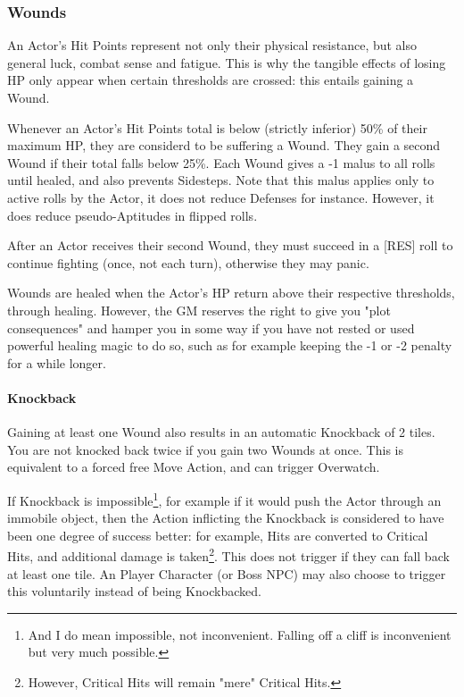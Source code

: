 \subsubsection{Wounds} 
\label{wounds}

An Actor's Hit Points represent not only their physical resistance, but also general luck, combat sense and fatigue. This is why the tangible effects of losing HP only appear when certain thresholds are crossed: this entails gaining a Wound.

Whenever an Actor's Hit Points total is below (strictly inferior) 50\% of their maximum HP, they are considerd to be suffering a Wound. They gain a second Wound if their total falls below 25\%. Each Wound gives a -1 malus to all rolls until healed, and also prevents Sidesteps. Note that this malus applies only to active rolls by the Actor, it does not reduce Defenses for instance. However, it does reduce pseudo-Aptitudes in flipped rolls.

After an Actor receives their second Wound, they must succeed in a [RES] roll to continue fighting (once, not each turn), otherwise they may panic. 

Wounds are healed when the Actor's HP return above their respective thresholds, through healing. However, the GM reserves the right to give you "plot consequences" and hamper you in some way if you have not rested or used powerful healing magic to do so, such as for example keeping the -1 or -2 penalty for a while longer.

\paragraph{Knockback}

Gaining at least one Wound also results in an automatic Knockback of 2 tiles. You are not knocked back twice if you gain two Wounds at once. This is equivalent to a forced free Move Action, and can trigger Overwatch. 

If Knockback is impossible\footnote{And I do mean impossible, not inconvenient. Falling off a cliff is inconvenient but very much possible.}, for example if it would push the Actor through an immobile object, then the Action inflicting the Knockback is considered to have been one degree of success better: for example, Hits are converted to Critical Hits, and additional damage is taken\footnote{However, Critical Hits will remain "mere" Critical Hits.}. This does not trigger if they can fall back at least one tile. An Player Character (or Boss NPC) may also choose to trigger this voluntarily instead of being Knockbacked.

